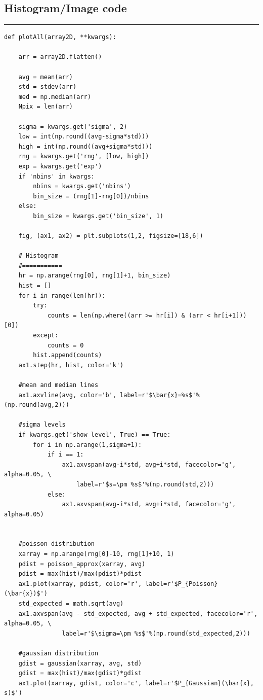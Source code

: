 \documentclass[preprint]{aastex62}
\begin{document}
\subsection{Histogram/Image code} \label{code:plots} 
\hrule
\begin{lstlisting}
def plotAll(array2D, **kwargs):
    
    arr = array2D.flatten()
    
    avg = mean(arr)
    std = stdev(arr)
    med = np.median(arr)
    Npix = len(arr)    
    
    sigma = kwargs.get('sigma', 2)
    low = int(np.round((avg-sigma*std)))
    high = int(np.round((avg+sigma*std)))
    rng = kwargs.get('rng', [low, high])
    exp = kwargs.get('exp')
    if 'nbins' in kwargs:
        nbins = kwargs.get('nbins')
        bin_size = (rng[1]-rng[0])/nbins
    else:
        bin_size = kwargs.get('bin_size', 1)
    
    fig, (ax1, ax2) = plt.subplots(1,2, figsize=[18,6])
    
    # Histogram
    #===========
    hr = np.arange(rng[0], rng[1]+1, bin_size)
    hist = []
    for i in range(len(hr)):
        try:
            counts = len(np.where((arr >= hr[i]) & (arr < hr[i+1]))[0])
        except:
            counts = 0
        hist.append(counts)
    ax1.step(hr, hist, color='k')

    #mean and median lines
    ax1.axvline(avg, color='b', label=r'$\bar{x}=%s$'%(np.round(avg,2)))
    
    #sigma levels
    if kwargs.get('show_level', True) == True:
        for i in np.arange(1,sigma+1):
            if i == 1:
                ax1.axvspan(avg-i*std, avg+i*std, facecolor='g', alpha=0.05, \
                    label=r'$s=\pm %s$'%(np.round(std,2)))
            else:
                ax1.axvspan(avg-i*std, avg+i*std, facecolor='g', alpha=0.05)
                
                
    #poisson distribution
    xarray = np.arange(rng[0]-10, rng[1]+10, 1)
    pdist = poisson_approx(xarray, avg)
    pdist = max(hist)/max(pdist)*pdist
    ax1.plot(xarray, pdist, color='r', label=r'$P_{Poisson}(\bar{x})$')
    std_expected = math.sqrt(avg)
    ax1.axvspan(avg - std_expected, avg + std_expected, facecolor='r', alpha=0.05, \
                label=r'$\sigma=\pm %s$'%(np.round(std_expected,2)))
    
    #gaussian distribution
    gdist = gaussian(xarray, avg, std)
    gdist = max(hist)/max(gdist)*gdist
    ax1.plot(xarray, gdist, color='c', label=r'$P_{Gaussian}(\bar{x}, s)$')
    

\end{lstlisting}
\end{document}
